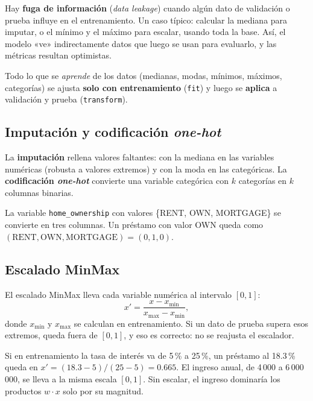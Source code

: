 \documentclass[11pt,a4paper]{article}
\newcommand{\code}[1]{\texttt{#1}}
\begin{document}
Hay \textbf{fuga de información} (\textit{data leakage}) cuando algún dato de validación o prueba influye en el entrenamiento. Un caso típico: calcular la mediana para imputar, o el mínimo y el máximo para escalar, usando toda la base. Así, el modelo «ve» indirectamente datos que luego se usan para evaluarlo, y las métricas resultan optimistas.

\begin{clave}
Todo lo que se \emph{aprende} de los datos (medianas, modas, mínimos, máximos, categorías) se ajusta \textbf{solo con entrenamiento} (\code{fit}) y luego se \textbf{aplica} a validación y prueba (\code{transform}).
\end{clave}

\subsection{Imputación y codificación \textit{one-hot}}

La \textbf{imputación} rellena valores faltantes: con la mediana en las variables numéricas (robusta a valores extremos) y con la moda en las categóricas. La \textbf{codificación \textit{one-hot}} convierte una variable categórica con $k$ categorías en $k$ columnas binarias.

\begin{ejemplo}
La variable \code{home\_ownership} con valores \{RENT, OWN, MORTGAGE\} se convierte en tres columnas. Un préstamo con valor OWN queda como $(\text{RENT},\text{OWN},\text{MORTGAGE}) = (0,1,0)$.
\end{ejemplo}

\subsection{Escalado MinMax}

El escalado MinMax lleva cada variable numérica al intervalo $[0,1]$:
\begin{equation}
x' = \frac{x - x_{\min}}{x_{\max} - x_{\min}},
\end{equation}
donde $x_{\min}$ y $x_{\max}$ se calculan en entrenamiento. Si un dato de prueba supera esos extremos, queda fuera de $[0,1]$, y eso es correcto: no se reajusta el escalador.

\begin{ejemplo}
Si en entrenamiento la tasa de interés va de 5\,\% a 25\,\%, un préstamo al 18.3\,\% queda en $x'=(18.3-5)/(25-5)=0.665$. El ingreso anual, de 4\,000 a 6\,000\,000, se lleva a la misma escala $[0,1]$. Sin escalar, el ingreso dominaría los productos $w\cdot x$ solo por su magnitud.
\end{ejemplo}
\end{document}
